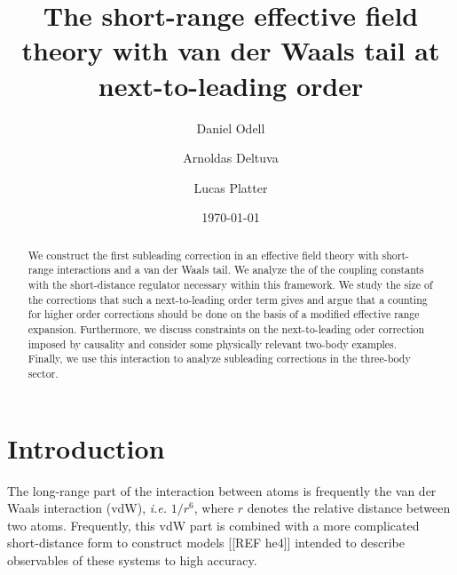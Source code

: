 \documentclass[aps,preprint,superscriptaddress]{revtex4-1}
\begin{document}
\title{The short-range effective field theory with van der Waals tail
  at next-to-leading order} \author{Daniel Odell}
 
 \author{Arnoldas Deltuva}
\author{Lucas Platter} 
 
\date{\today}

\listoftodos

\begin{abstract}
  We construct the first subleading correction in an effective field
  theory with short-range interactions and a van der Waals tail. We
  analyze the of the coupling constants with the short-distance
  regulator necessary within this framework. We study the size of the
  corrections that such a next-to-leading order term gives and argue
  that a counting for higher order corrections should be done on the
  basis of a modified effective range expansion. Furthermore, we
  discuss constraints on the next-to-leading oder correction imposed
  by causality and consider some physically relevant two-body
  examples. Finally, we use this interaction to analyze subleading
  corrections in the three-body sector.
\end{abstract}

\smallskip
\maketitle

\newpage
\section{Introduction}
\label{sec:introduction}
The long-range part of the interaction between atoms is frequently the
van der Waals interaction (vdW), {\it i.e.} $1/r^6$, where $r$ denotes
the relative distance between two atoms. Frequently, this vdW part is
combined with a more complicated short-distance form to construct
models [[REF he4]] intended to describe observables of these systems
to high accuracy.
\end{document}

